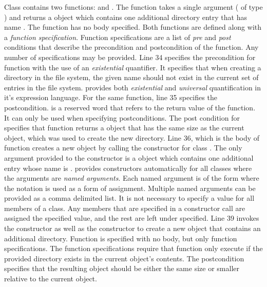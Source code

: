 Class  contains two functions:  and
. The  function takes a single argument
( of type ) and returns a 
object which contains one additional directory entry that has name
. The  function has no body specified. Both
functions are defined along with a {\em function
  specification}. Function specifications are a list of {\em pre} and
{\em post} conditions that describe the precondition and postcondition
of the function. Any number of specifications may be provided. Line 34
specifies the precondition for function  with the use of
an {\em existential} quantifier. It specifies that when creating a
directory in the file system, the given name  should not exist
in the current set of entries in the file system. \Klang{} provides
both {\em existential} and {\em universal} quantification in it's
expression language. For the same function, line 35 specifies the
postcondition.  is a reserved word that refers to the
return value of the function. It can only be used when specifying
postconditions. The post condition for  specifies that
function  returns a  object that has the
same size as the current  object, which was used to
create the new directory. Line 36, which is the body of function
 creates a new  object by calling the
constructor for class . The only argument provided to
the constructor is a  object which contains one additional
 entry whose name is . \Klang{} provides
constructors automatically for all classes where the arguments are
{\em named arguments}. Each named argument is of the form  where the \code{::} notation is used as a form of
assignment. Multiple named arguments can be provided as a comma
delimited list. It is not necessary to specify a value for all members
of a class. Any members that are specified in a constructor call are
assigned the specified value, and the rest are left under
specified. Line 39 invokes the  constructor as well
as the  constructor to create a new  object
that contains an additional directory. Function  is
specified with no body, but only function specifications. The function
specifications require that function  only execute if the
provided directory  exists in the current object's
contents. The postcondition specifies that the resulting
 object should be either the same size or smaller
relative to the current object.

